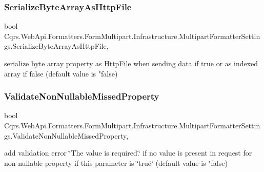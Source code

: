 \subsubsection{\texorpdfstring{Serialize\+Byte\+Array\+As\+Http\+File}{SerializeByteArrayAsHttpFile}}
{\footnotesize\ttfamily bool Cqrs.\+Web\+Api.\+Formatters.\+Form\+Multipart.\+Infrastructure.\+Multipart\+Formatter\+Settings.\+Serialize\+Byte\+Array\+As\+Http\+File\hspace{0.3cm}{\ttfamily [get]}, {\ttfamily [set]}}



serialize byte array property as \hyperlink{classCqrs_1_1WebApi_1_1Formatters_1_1FormMultipart_1_1Infrastructure_1_1HttpFile}{Http\+File} when sending data if true or as indexed array if false (default value is "false) 

\mbox{\label{classCqrs_1_1WebApi_1_1Formatters_1_1FormMultipart_1_1Infrastructure_1_1MultipartFormatterSettings_a8db49349b200f3aea3fc9642ca1f9fd9_a8db49349b200f3aea3fc9642ca1f9fd9}} 
\subsubsection{\texorpdfstring{Validate\+Non\+Nullable\+Missed\+Property}{ValidateNonNullableMissedProperty}}
{\footnotesize\ttfamily bool Cqrs.\+Web\+Api.\+Formatters.\+Form\+Multipart.\+Infrastructure.\+Multipart\+Formatter\+Settings.\+Validate\+Non\+Nullable\+Missed\+Property\hspace{0.3cm}{\ttfamily [get]}, {\ttfamily [set]}}



add validation error \char`\"{}\+The value is required.\char`\"{} if no value is present in request for non-\/nullable property if this parameter is \char`\"{}true\char`\"{} (default value is "false) 

